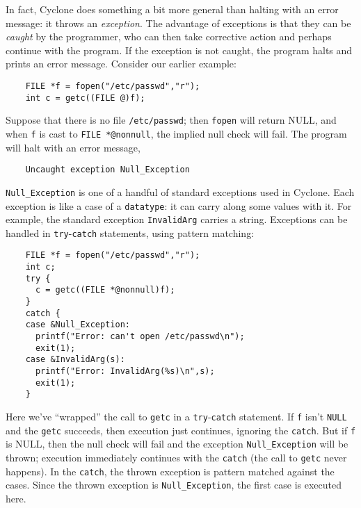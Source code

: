 In fact, Cyclone does something a bit more general than halting with
an error message: it throws an \emph{exception}.  The advantage of
exceptions is that they can be \emph{caught} by the programmer, who
can then take corrective action and perhaps continue with the program.
If the exception is not caught, the program halts and prints an error
message.  Consider our earlier example:
\begin{verbatim}
    FILE *f = fopen("/etc/passwd","r");
    int c = getc((FILE @)f);
\end{verbatim}
Suppose that there is no file \texttt{/etc/passwd}; then
\texttt{fopen} will return NULL, and when \texttt{f} is cast to
\texttt{FILE *@nonnull}, the implied null check will fail.  The program will
halt with an error message,
\begin{verbatim}
    Uncaught exception Null_Exception
\end{verbatim}
\texttt{Null_Exception} is one of a handful of standard exceptions
used in Cyclone.  Each exception is like a case of a \texttt{datatype}:
it can carry along some values with it.  For example, the standard
exception \texttt{InvalidArg} carries a string.  Exceptions can be
handled in \texttt{try}-\texttt{catch} statements, using pattern
matching:
\begin{verbatim}
    FILE *f = fopen("/etc/passwd","r");
    int c;
    try {
      c = getc((FILE *@nonnull)f);
    }
    catch {
    case &Null_Exception:
      printf("Error: can't open /etc/passwd\n");
      exit(1);
    case &InvalidArg(s):
      printf("Error: InvalidArg(%s)\n",s);
      exit(1);
    }
\end{verbatim}
Here we've ``wrapped'' the call to \texttt{getc} in a
\texttt{try}-\texttt{catch} statement.  If \texttt{f} isn't \texttt{NULL} and
the \texttt{getc} succeeds, then execution just continues, ignoring
the \texttt{catch}.  But if \texttt{f} is NULL, then the null check
will fail and the exception \texttt{Null_Exception} will be thrown;
execution immediately continues with the \texttt{catch} (the call to
\texttt{getc} never happens).  In the \texttt{catch}, the thrown
exception is pattern matched against the cases.  Since the thrown
exception is \texttt{Null_Exception}, the first case is executed here.

